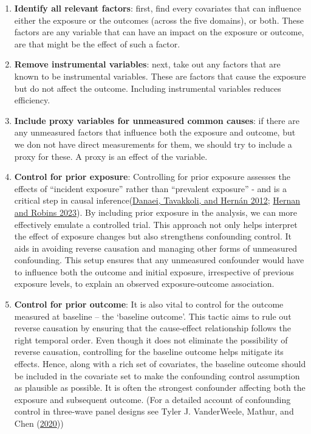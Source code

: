 \documentclass[
  singlecolumn]{report}
\begin{document}
\begin{enumerate}
\def\labelenumi{\arabic{enumi}.}
\item
  \textbf{Identify all relevant factors}: first, find every covariates
  that can influence either the exposure or the outcomes (across the
  five domains), or both. These factors are any variable that can have
  an impact on the exposure or outcome, are that might be the effect of
  such a factor.
\item
  \textbf{Remove instrumental variables}: next, take out any factors
  that are known to be instrumental variables. These are factors that
  cause the exposure but do not affect the outcome. Including
  instrumental variables reduces efficiency.
\item
  \textbf{Include proxy variables for unmeasured common causes}: if
  there are any unmeasured factors that influence both the exposure and
  outcome, but we don not have direct measurements for them, we should
  try to include a proxy for these. A proxy is an effect of the
  variable.
\item
  \textbf{Control for prior exposure}: Controlling for prior exposure
  assesses the effects of ``incident exposure'' rather than ``prevalent
  exposure'' - and is a critical step in causal
  inference(\protect\hyperlink{ref-danaei2012}{Danaei, Tavakkoli, and
  Hernán 2012}; \protect\hyperlink{ref-hernan2023}{Hernan and Robins
  2023}). By including prior exposure in the analysis, we can more
  effectively emulate a controlled trial. This approach not only helps
  interpret the effect of exposure changes but also strengthens
  confounding control. It aids in avoiding reverse causation and
  managing other forms of unmeasured confounding. This setup ensures
  that any unmeasured confounder would have to influence both the
  outcome and initial exposure, irrespective of previous exposure
  levels, to explain an observed exposure-outcome association.
\item
  \textbf{Control for prior outcome}: It is also vital to control for
  the outcome measured at baseline -- the `baseline outcome'. This
  tactic aims to rule out reverse causation by ensuring that the
  cause-effect relationship follows the right temporal order. Even
  though it does not eliminate the possibility of reverse causation,
  controlling for the baseline outcome helps mitigate its effects.
  Hence, along with a rich set of covariates, the baseline outcome
  should be included in the covariate set to make the confounding
  control assumption as plausible as possible. It is often the strongest
  confounder affecting both the exposure and subsequent outcome. (For a
  detailed account of confounding control in three-wave panel designs
  see Tyler J. VanderWeele, Mathur, and Chen
  (\protect\hyperlink{ref-vanderweele2020}{2020}))
\end{enumerate}
\end{document}
